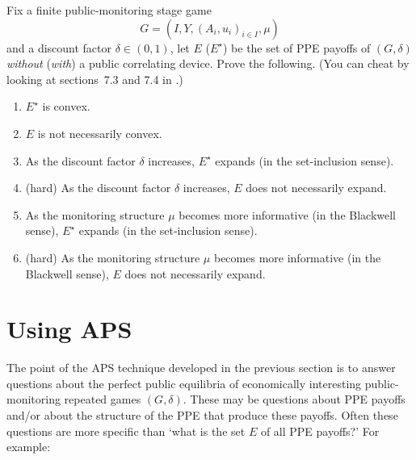 \begin{exercise}
	\label{exercise:ppe_mcs}
	Fix a finite public-monitoring stage game
	\begin{equation*}
		G = (I,Y,(A_i,u_i)_{i \in I},\mu) 
	\end{equation*}
	and a discount factor $\delta \in (0,1)$, let $E$ ($E^\star$) be the set of PPE payoffs of $(G,\delta)$ \emph{without} (\emph{with}) a public correlating device. Prove the following. (You can cheat by looking at sections~7.3 and 7.4 in \textcite{MailathSamuelson2006}.)

	\begin{enumerate}[label=(\alph*)]

		\item $E^\star$ is convex.

		\item $E$ is not necessarily convex.

		\item As the discount factor $\delta$ increases, $E^\star$ expands (in the set-inclusion sense).

		\item (hard) As the discount factor $\delta$ increases, $E$ does not necessarily expand.

		\item As the monitoring structure $\mu$ becomes more informative (in the Blackwell sense), $E^\star$ expands (in the set-inclusion sense).

		\item (hard) As the monitoring structure $\mu$ becomes more informative (in the Blackwell sense), $E$ does not necessarily expand.
	
	\end{enumerate}
\end{exercise}



\section{Using APS}
\label{aps:aps}

The point of the APS technique developed in the previous section is to answer questions about the perfect public equilibria of economically interesting public-monitoring repeated games $(G,\delta)$. These may be questions about PPE payoffs and/or about the structure of the PPE that produce these payoffs. Often these questions are more specific than `what is the set $E$ of all PPE payoffs?' For example:

